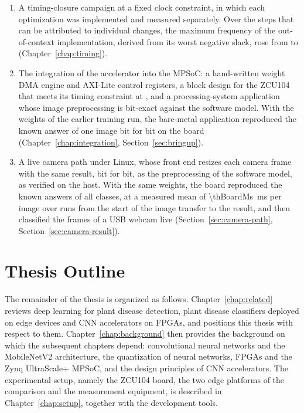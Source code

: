 \begin{enumerate}
    (Chapter~\ref{chap:software}, Section~\ref{sec:accuracy}).
  \item A timing-closure campaign at a fixed clock constraint, in which each
    optimization was implemented and measured separately. Over the steps that
    can be attributed to individual changes, the maximum frequency of the
    out-of-context implementation, derived from its worst negative slack, rose
    from \MHz{\thFmaxBase} to \MHz{\thFmaxPhaseThree}
    (Chapter~\ref{chap:timing}).
  \item The integration of the accelerator into the MPSoC: a hand-written
    weight DMA engine and AXI-Lite control registers, a block design for the
    ZCU104 that meets its timing constraint at \MHz{\thClkBoard}, and a
    processing-system application whose image preprocessing is bit-exact
    against the software model. With the weights of the earlier training run,
    the bare-metal application reproduced the known answer of one image bit
    for bit on the board (Chapter~\ref{chap:integration},
    Section~\ref{sec:bringup}).
  \item A live camera path under Linux, whose front end resizes each camera
    frame with the same result, bit for bit, as the preprocessing of the
    software model, as verified on the host. With the same weights, the board
    reproduced the known answers of all \thClasses{} classes, at a measured
    mean of \SI{\thBoardMs}{\milli\second} per image over \thBoardRuns{} runs
    from the start of the image transfer to the result, and then classified
    the frames of a USB webcam live (Section~\ref{sec:camera-path},
    Section~\ref{sec:camera-result}).
\end{enumerate}


\section{Thesis Outline}
\label{sec:outline}

The remainder of the thesis is organized as follows.
Chapter~\ref{chap:related} reviews deep learning for plant disease detection,
plant disease classifiers deployed on edge devices and CNN accelerators on
FPGAs, and positions this thesis with respect to them.
Chapter~\ref{chap:background} then provides the background on which the
subsequent chapters depend: convolutional neural networks and the MobileNetV2
architecture, the quantization of neural networks, FPGAs and the Zynq
UltraScale+ MPSoC, and the design principles of CNN accelerators. The
experimental setup, namely the ZCU104 board, the two edge platforms of the
comparison and the measurement equipment, is described in
Chapter~\ref{chap:setup}, together with the development tools.

